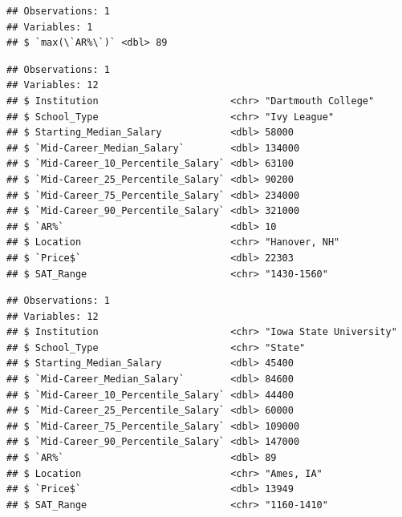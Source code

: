 \documentclass[]{article}
\newenvironment{Shaded}{\begin{snugshade}}{\end{snugshade}}
\newcommand{\KeywordTok}[1]{\textcolor[rgb]{0.13,0.29,0.53}{\textbf{#1}}}
\newcommand{\DataTypeTok}[1]{\textcolor[rgb]{0.13,0.29,0.53}{#1}}
\newcommand{\DecValTok}[1]{\textcolor[rgb]{0.00,0.00,0.81}{#1}}
\newcommand{\StringTok}[1]{\textcolor[rgb]{0.31,0.60,0.02}{#1}}
\newcommand{\OperatorTok}[1]{\textcolor[rgb]{0.81,0.36,0.00}{\textbf{#1}}}
\newcommand{\NormalTok}[1]{#1}
\begin{document}
\begin{verbatim}
## Observations: 1
## Variables: 1
## $ `max(\`AR%\`)` <dbl> 89
\end{verbatim}

\begin{Shaded}
\end{Shaded}

\begin{verbatim}
## Observations: 1
## Variables: 12
## $ Institution                       <chr> "Dartmouth College"
## $ School_Type                       <chr> "Ivy League"
## $ Starting_Median_Salary            <dbl> 58000
## $ `Mid-Career_Median_Salary`        <dbl> 134000
## $ `Mid-Career_10_Percentile_Salary` <dbl> 63100
## $ `Mid-Career_25_Percentile_Salary` <dbl> 90200
## $ `Mid-Career_75_Percentile_Salary` <dbl> 234000
## $ `Mid-Career_90_Percentile_Salary` <dbl> 321000
## $ `AR%`                             <dbl> 10
## $ Location                          <chr> "Hanover, NH"
## $ `Price$`                          <dbl> 22303
## $ SAT_Range                         <chr> "1430-1560"
\end{verbatim}

\begin{Shaded}
\end{Shaded}

\begin{verbatim}
## Observations: 1
## Variables: 12
## $ Institution                       <chr> "Iowa State University"
## $ School_Type                       <chr> "State"
## $ Starting_Median_Salary            <dbl> 45400
## $ `Mid-Career_Median_Salary`        <dbl> 84600
## $ `Mid-Career_10_Percentile_Salary` <dbl> 44400
## $ `Mid-Career_25_Percentile_Salary` <dbl> 60000
## $ `Mid-Career_75_Percentile_Salary` <dbl> 109000
## $ `Mid-Career_90_Percentile_Salary` <dbl> 147000
## $ `AR%`                             <dbl> 89
## $ Location                          <chr> "Ames, IA"
## $ `Price$`                          <dbl> 13949
## $ SAT_Range                         <chr> "1160-1410"
\end{verbatim}
\end{document}
